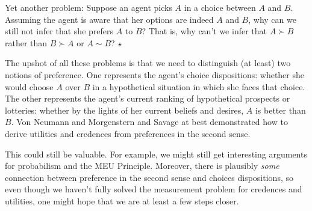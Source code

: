 \begin{exercise}
  Yet another problem: Suppose an agent picks $A$ in a choice between
  $A$ and $B$. Assuming the agent is aware that her options are indeed
  $A$ and $B$, why can we still not infer that she prefers $A$ to $B$?
  That is, why can't we infer that $A \succ B$ rather than $B \succ A$
  or $A \sim B$? $\star$
\end{exercise}


The upshot of all these problems is that we need to distinguish (at
least) two notions of preference. One represents the agent's choice
dispositions: whether she would choose $A$ over $B$ in a hypothetical
situation in which she faces that choice. The other represents the
agent's current ranking of hypothetical prospects or lotteries:
whether by the lights of her current beliefs and desires, $A$ is
better than $B$. Von Neumann and Morgenstern and Savage at best
demonstrated how to derive utilities and credences from preferences in
the second sense.

This could still be valuable. For example, we might still get
interesting arguments for probabilism and the MEU Principle. Moreover,
there is plausibly \emph{some} connection between preference in the
second sense and choices dispositions, so even though we haven't fully
solved the measurement problem for credences and utilities, one might
hope that we are at least a few steps closer.


